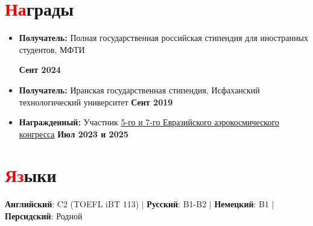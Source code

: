 \documentclass[a4paper, 10pt]{article}
\newcommand{\resumeItem}[1]{
    \item\small{
        {#1 \vspace{-2pt}}
    }
}
\begin{document}
\section{\textcolor{red}{На}грады}
\begin{itemize}
    \resumeItem{\parbox[t]{\dimexpr\linewidth-3cm}{\textbf{Получатель:} Полная государственная российская стипендия для иностранных студентов, МФТИ}} \hfill \textbf{Сент 2024}
    \resumeItem{\textbf{Получатель:} Иранская государственная стипендия, Исфаханский технологический университет} \hfill \textbf{Сент 2019}
    \resumeItem{\textbf{Награжденный:} Участник \href{https://congress.aero/en/}{5-го и 7-го Евразийского аэрокосмического конгресса}} \hfill \textbf{Июл 2023 и 2025}

\end{itemize}
\vspace{-10pt}

\section{\textcolor{red}{Яз}ыки}
    \begin{center}
    \textbf{Английский}: C2 (TOEFL iBT 113) \quad $|$ \quad
    \textbf{Русский}: B1-B2 \quad $|$ \quad
    \textbf{Немецкий}: B1 \quad $|$ \quad
    \textbf{Персидский}: Родной
\end{center}
\end{document}

